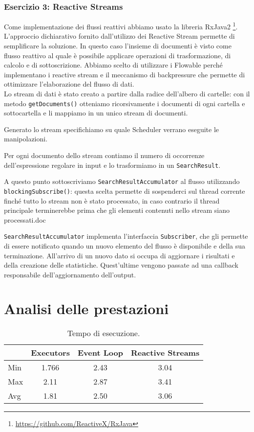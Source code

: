 \documentclass[a4paper]{article}
\begin{document}
\subsubsection{Esercizio 3: Reactive Streams}
Come implementazione dei flussi reattivi abbiamo usato la libreria RxJava2 \footnote{\url{https://github.com/ReactiveX/RxJava}}.
L'approccio dichiarativo fornito dall'utilizzo dei Reactive Stream permette di semplificare la soluzione.
In questo caso l'insieme di documenti è visto come flusso reattivo al quale è possibile applicare operazioni di trasformazione, di calcolo e di sottoscrizione.  
Abbiamo scelto di utilizzare i Flowable perché implementano i reactive stream e il meccanismo di backpressure che permette di ottimizzare l'elaborazione del flusso di dati.\\
Lo stream di dati è stato creato a partire dalla radice dell'albero di cartelle: con il metodo \texttt{getDocuments()} otteniamo ricorsivamente i documenti di ogni cartella e sottocartella e li mappiamo in un unico stream di documenti.

Generato lo stream specifichiamo su quale Scheduler verrano eseguite le manipolazioni.

Per ogni documento dello stream contiamo il numero di occorrenze dell'espressione regolare in input e lo trasformiamo in un \texttt{SearchResult}.

A questo punto sottoscriviamo \texttt{SearchResultAccumulator} al flusso utilizzando \texttt{blockingSubscribe()}: questa scelta permette di sospenderci sul thread corrente finché tutto lo stream non è stato processato, in caso contrario il thread principale terminerebbe prima che gli elementi contenuti nello stream siano processati.doc

\texttt{SearchResultAccumulator} implementa l'interfaccia \texttt{Subscriber}, che gli permette di essere notificato quando un nuovo elemento del flusso è disponibile e della sua terminazione.
All'arrivo di un nuovo dato si occupa di aggiornare i risultati e della creazione delle statistiche. Quest'ultime vengono passate ad una callback responsabile dell'aggiornamento dell'output.

\section{Analisi delle prestazioni}\label{analisi-delle-prestazioni}

\begin{table}[H]
\centering
\label{my-label}
\begin{tabular}{l|ccc}
\hline
    & Executors & Event Loop & Reactive Streams \\ \hline
Min & 1.766     & 2.43       & 3.04            \\
Max & 2.11      & 2.87       & 3.41            \\
Avg & 1.81      & 2.50       & 3.06            \\ \hline
\end{tabular}
\caption{Tempo di esecuzione.}
\label{Tabella speedup del sistema}
\end{table}

\end{document}
